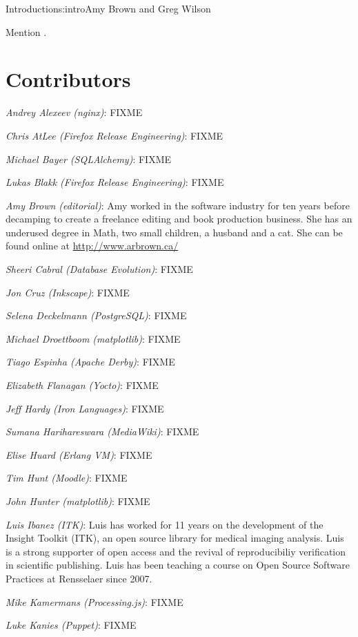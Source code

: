 \begin{aosachapter}{Introduction}{s:intro}{Amy Brown and Greg Wilson}

Mention \cite{bib:aosa1}.

\section*{Contributors}

\emph{Andrey Alexeev (nginx)}: FIXME

\emph{Chris AtLee (Firefox Release Engineering)}: FIXME

\emph{Michael Bayer (SQLAlchemy)}: FIXME

\emph{Lukas Blakk (Firefox Release Engineering)}: FIXME

\emph{Amy Brown (editorial)}: Amy worked in the software industry for
ten years before decamping to create a freelance editing and book production
business. She has an underused degree in Math, two small children, a
husband and a cat. She can be found online at \url{http://www.arbrown.ca/}

\emph{Sheeri Cabral (Database Evolution)}: FIXME

\emph{Jon Cruz (Inkscape)}: FIXME

\emph{Selena Deckelmann (PostgreSQL)}: FIXME

\emph{Michael Droettboom (matplotlib)}: FIXME

\emph{Tiago Espinha (Apache Derby)}: FIXME

\emph{Elizabeth Flanagan (Yocto)}: FIXME

\emph{Jeff Hardy (Iron Languages)}: FIXME

\emph{Sumana Harihareswara (MediaWiki)}: FIXME

\emph{Elise Huard (Erlang VM)}: FIXME

\emph{Tim Hunt (Moodle)}: FIXME

\emph{John Hunter (matplotlib)}: FIXME

\emph{Luis Ibanez (ITK)}: Luis has worked for 11 years on the development of
the Insight Toolkit (ITK), an open source library for medical imaging analysis.
Luis is a strong supporter of open access and the revival of reproducibiliy
verification in scientific publishing. Luis has been teaching a course on Open
Source Software Practices at Rensselaer since 2007.

\emph{Mike Kamermans (Processing.js)}: FIXME

\emph{Luke Kanies (Puppet)}: FIXME


\end{aosachapter}
